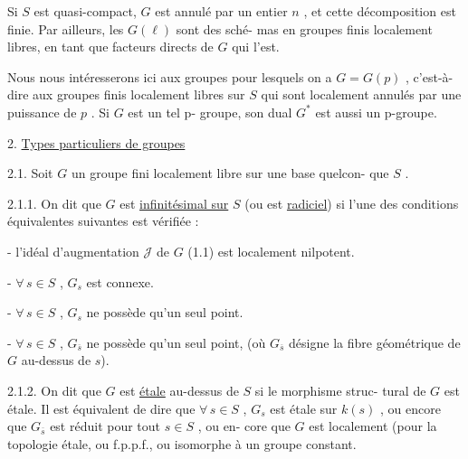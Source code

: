 
Si $S$ est quasi-compact, $G$ est annulé par un entier $n$ ,
et cette décomposition est finie. Par ailleurs, les $G(\ell)$ sont des sché-%
mas en groupes finis localement libres, en tant que facteurs directs de
$G$ qui l'est.

Nous nous intéresserons ici aux groupes pour lesquels on a
$G = G(p)$ , c'est-à-dire aux groupes finis localement libres sur $S$ qui
sont localement annulés par une puissance de $p$ . Si $G$ est un tel p-%
groupe, son dual $G^*$ est aussi un p-groupe.

2. \uline{Types particuliers de groupes}

2.1. Soit $G$ un groupe fini localement libre sur une base quelcon-%
que $S$ .

2.1.1. On dit que $G$ est \uline{infinitésimal sur} $S$ (ou est \uline{radiciel}) si
l'une des conditions équivalentes suivantes est vérifiée :

- l'idéal d'augmentation $\mathcal{J}$ de $G$ (1.1) est localement nilpotent.

- $\forall\, s \in S$ , $G_s$ est connexe.

- $\forall\, s \in S$ , $G_s$ ne possède qu'un seul point.

- $\forall\, s \in S$ , $G_{\overline{s}}$ ne possède qu'un seul point, (où $G_{\overline{s}}$ désigne
la fibre géométrique de $G$ au-dessus de $s$).

2.1.2. On dit que $G$ est \uline{étale} au-dessus de $S$ si le morphisme struc-%
tural de $G$ est étale. Il est équivalent de dire que $\forall\, s \in S$ , $G_s$ est
étale sur $k(s)$ , ou encore que $G_{\overline{s}}$ est réduit pour tout $s \in S$ , ou en-%
 core que $G$ est localement (pour la topologie étale, ou f.p.p.f., ou 
isomorphe à un groupe constant.

